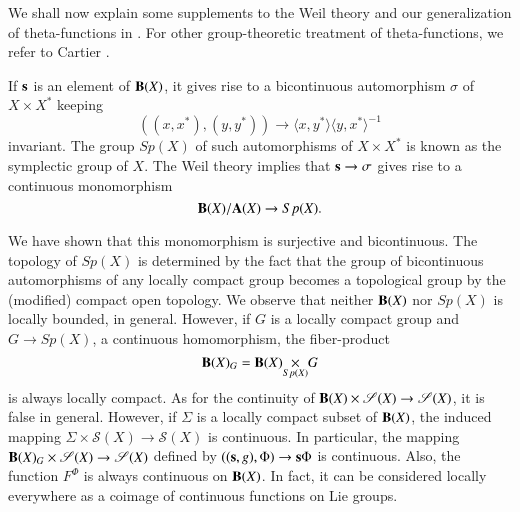 We shall now explain some supplements to the Weil theory and our generalization of theta-functions in \cite{art12-key13}. For other group-theoretic treatment of theta-functions, we refer to Cartier \cite{art12-key5}.

If $\mathbf{s}$ is an element of $\mathbf{B}(X)$, it gives rise to a bicontinuous automorphism $\sigma$ of $X\times X^{*}$ keeping
$$
((x,x^{*}),(y,y^{*}))\to \langle x,y^{*}\rangle \langle y,x^{*}\rangle^{-1}
$$
invariant. The group $Sp(X)$ of such automorphisms of $X\times X^{*}$ is known as the symplectic group of $X$. The Weil theory implies that $\mathbf{s}\to \sigma$ gives rise to a continuous monomorphism
$$
\mathbf{B}(X)/\mathbf{A}(X)\to Sp(X).
$$\pageoriginale

\eject

We have shown that this monomorphism is surjective and bicontinuous. The topology of $Sp(X)$ is determined by the fact that the group of bicontinuous automorphisms of any locally compact group becomes a topological group by the (modified) compact open topology. We observe that neither $\mathbf{B}(X)$ nor $Sp(X)$ is locally bounded, in general. However, if $G$ is a locally compact group and $G\to Sp(X)$, a continuous homomorphism, the fiber-product
$$
\bfB(X)_{G}=\fprod{\bfB(X)}{G}{Sp(X)}
$$
is always locally compact. As for the continuity of $\mathbf{B}(X)\times \mathscr{S}(X)\to \mathscr{S}(X)$, it is false in general. However, if $\Sigma$ is a locally compact subset of $\mathbf{B}(X)$, the induced mapping $\Sigma\times \mathscr{S}(X)\to \mathscr{S}(X)$ is continuous. In particular, the mapping $\mathbf{B}(X)_{G}\times \mathscr{S}(X)\to \mathscr{S}(X)$ defined by $((\mathbf{s},g),\Phi)\to \mathbf{s}\Phi$ is continuous. Also, the function $F^{\Phi}$ is always continuous on $\mathbf{B}(X)$. In fact, it can be considered locally everywhere as a coimage of continuous functions on Lie groups.

